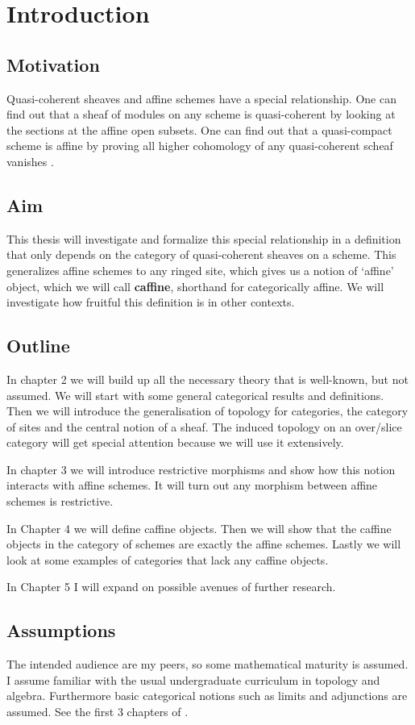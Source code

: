 \chapter{Introduction}

\section{Motivation}
Quasi-coherent sheaves and affine schemes have a special relationship. One can find out that a sheaf of modules on any scheme is quasi-coherent by looking at the sections at the affine open subsets. One can find out that a quasi-compact scheme is affine by proving all higher cohomology of any quasi-coherent scheaf vanishes \cite[Tag 01XF]{stacks}. 

\section{Aim}
This thesis will investigate 
and formalize this special relationship in 
a definition that only depends on the category of quasi-coherent sheaves on a scheme. 
This generalizes affine schemes to any ringed site, which gives us a notion of `affine' object, which we will call \textbf{caffine}, shorthand for categorically affine.
We will investigate how fruitful this definition is in other contexts.

\section{Outline}
In chapter 2 we will build up all the necessary theory that is well-known, but not assumed.
We will start with some general categorical results and definitions. Then we will introduce the generalisation of topology for categories, the category of sites and the central notion of a sheaf. The induced topology on an over/slice category will get special attention because we will use it extensively.

In chapter 3 we will introduce restrictive morphisms and show how this notion interacts with affine schemes.
It will turn out any morphism between affine schemes is restrictive.

In Chapter 4 we will define caffine objects.
Then we will show that the caffine objects in the category of schemes are exactly the affine schemes.
Lastly we will look at some examples of categories that lack any caffine objects.

In Chapter 5 I will expand on possible avenues of further research.

\section{Assumptions}
The intended audience are my peers, so some mathematical maturity is assumed.
I assume familiar with the usual undergraduate curriculum in topology and algebra. Furthermore basic categorical notions such as limits and adjunctions are assumed.
See the first 3 chapters of \cite{catsUU}.